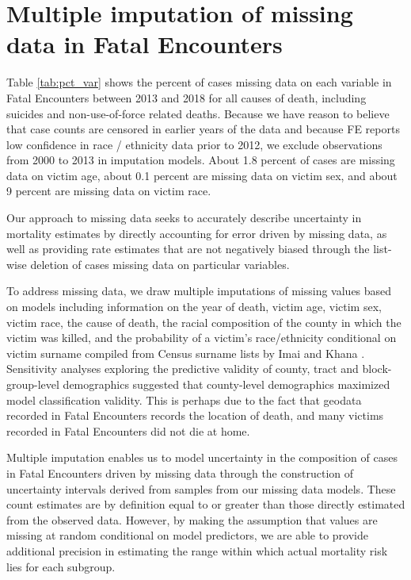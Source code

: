 \documentclass[9pt,twoside,lineno]{pnas-new}
\begin{document}
\section*{Multiple imputation of missing data in Fatal Encounters}

Table \ref{tab:pct_var} shows the percent of cases missing data on each variable in Fatal Encounters between 2013 and 2018 for all causes of death, including suicides and non-use-of-force related deaths. Because we have reason to believe that case counts are censored in earlier years of the data and because FE reports low confidence in race / ethnicity data prior to 2012, we exclude observations from 2000 to 2013 in imputation models. About 1.8 percent of cases are missing data on victim age, about 0.1 percent are missing data on victim sex, and about 9 percent are missing data on victim race. 

Our approach to missing data seeks to accurately describe uncertainty in mortality estimates by directly accounting for error driven by missing data, as well as providing rate estimates that are not negatively biased through the list-wise deletion of cases missing data on particular variables.



To address missing data, we draw multiple imputations of missing values based on models including information on the year of death, victim age, victim sex, victim race, the cause of death, the racial composition of the county in which the victim was killed, and the probability of a victim's race/ethnicity conditional on victim surname compiled from Census surname lists by Imai and Khana \cite{imai2016improving}. Sensitivity analyses exploring the predictive validity of county, tract and block-group-level demographics suggested that county-level demographics maximized model classification validity. This is perhaps due to the fact that geodata recorded in Fatal Encounters records the location of death, and many victims recorded in Fatal Encounters did not die at home. 

Multiple imputation enables us to model uncertainty in the composition of cases in Fatal Encounters driven by missing data through the construction of uncertainty intervals derived from samples from our missing data models. These count estimates are by definition equal to or greater than those directly estimated from the observed data. However, by making the assumption that values are missing at random conditional on model predictors, we are able to provide additional precision in estimating the range within which actual mortality risk lies for each subgroup. 
\end{document}
